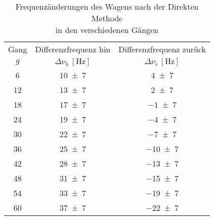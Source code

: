 \begin{table}[!h]
	\centering
	\begin{tabular}{|c|c|c|}
		\hline
		Gang & Differenzfrequenz hin & Differenzfrequenz zurück\\
		$g$ & $\Delta \nu_{h}\,[\si{\hertz}]$ & $\Delta \nu_{r}\,[\si{\hertz}]$\\\hline\hline
		\num{6}  & \num{10(7)}  & \num{4(7)} \\
		\num{12}  & \num{13(7)}  & \num{2(7)} \\
		\num{18}  & \num{17(7)}  & \num{-1(7)} \\
		\num{24}  & \num{19(7)}  & \num{-4(7)} \\
		\num{30}  & \num{22(7)}  & \num{-7(7)} \\
		\num{36}  & \num{25(7)}  & \num{-10(7)} \\
		\num{42}  & \num{28(7)}  & \num{-13(7)} \\
		\num{48}  & \num{31(7)}  & \num{-15(7)} \\
		\num{54}  & \num{33(7)}  & \num{-19(7)} \\
		\num{60}  & \num{37(7)}  & \num{-22(7)} \\
		\hline
	\end{tabular}
	\caption{Frequenzänderungen des Wagens nach der Direkten Methode\\ \hspace*{1.95cm} in den verschiedenen Gängen \label{tab:Auswertung_Frequenzänderung_Direkt}}
\end{table}